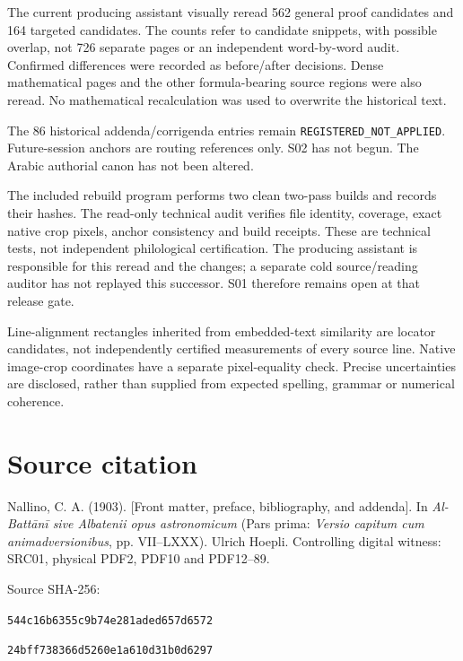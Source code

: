 \documentclass[11pt]{article}
\begin{document}
The current producing assistant visually reread 562 general proof candidates and 164 targeted candidates. The counts refer to candidate snippets, with possible overlap, not 726 separate pages or an independent word-by-word audit. Confirmed differences were recorded as before/after decisions. Dense mathematical pages and the other formula-bearing source regions were also reread. No mathematical recalculation was used to overwrite the historical text.

The 86 historical addenda/corrigenda entries remain \texttt{REGISTERED\_NOT\_APPLIED}. Future-session anchors are routing references only. S02 has not begun. The Arabic authorial canon has not been altered.

The included rebuild program performs two clean two-pass builds and records their hashes. The read-only technical audit verifies file identity, coverage, exact native crop pixels, anchor consistency and build receipts. These are technical tests, not independent philological certification. The producing assistant is responsible for this reread and the changes; a separate cold source/reading auditor has not replayed this successor. S01 therefore remains open at that release gate.

Line-alignment rectangles inherited from embedded-text similarity are locator candidates, not independently certified measurements of every source line. Native image-crop coordinates have a separate pixel-equality check. Precise uncertainties are disclosed, rather than supplied from expected spelling, grammar or numerical coherence.

\section*{Source citation}
Nallino, C. A. (1903). [Front matter, preface, bibliography, and addenda]. In \textit{Al-Battānī sive Albatenii opus astronomicum} (Pars prima: \textit{Versio capitum cum animadversionibus}, pp. VII–LXXX). Ulrich Hoepli. Controlling digital witness: SRC01, physical PDF2, PDF10 and PDF12–89.

{\small Source SHA-256:\par\texttt{544c16b6355c9b74e281aded657d6572}\par\texttt{24bff738366d5260e1a610d31b0d6297}\par}
\end{document}
